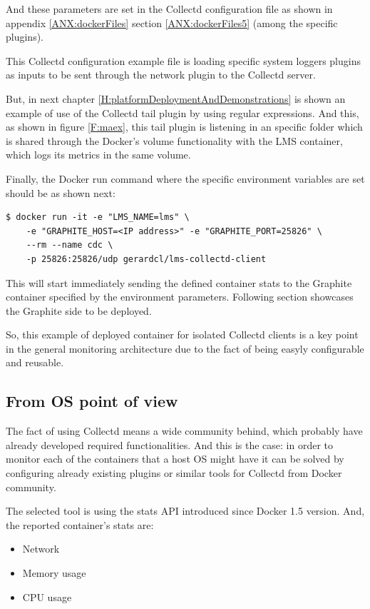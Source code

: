 And these parameters are set in the Collectd configuration file as shown in appendix \ref{ANX:dockerFiles} section \ref{ANX:dockerFiles5} (among the specific plugins).

This Collectd configuration example file is loading specific system loggers plugins as inputs to be sent through the network plugin to the Collectd server.

But, in next chapter \ref{H:platformDeploymentAndDemonstrations} is shown an example of use of the Collectd tail plugin by using regular expressions. And this, as shown in figure \ref{F:maex}, this tail plugin is listening in an specific folder which is shared through the Docker's volume functionality with the LMS container, which logs its metrics in the same volume.

Finally, the Docker run command where the specific environment variables are set should be as shown next:
\begin{verbatim}
$ docker run -it -e "LMS_NAME=lms" \
	-e "GRAPHITE_HOST=<IP address>" -e "GRAPHITE_PORT=25826" \
	--rm --name cdc \
	-p 25826:25826/udp gerardcl/lms-collectd-client
\end{verbatim}

This will start immediately sending the defined container stats to the Graphite container specified by the environment parameters. Following section showcases the Graphite side to be deployed.

So, this example of deployed container for isolated Collectd clients is a key point in the general monitoring architecture due to the fact of being easyly configurable and reusable.

\subsection{From OS point of view}

The fact of using Collectd means a wide community behind, which probably have already developed required functionalities. And this is the case: in order to monitor each of the containers that a host OS might have it can be solved by configuring already existing plugins or similar tools for Collectd from Docker community. 

The selected tool is using the stats API introduced since Docker 1.5 version. And, the reported container's stats are:
 
\begin{itemize}
\item Network
\item Memory usage
\item CPU usage
\end{itemize}

